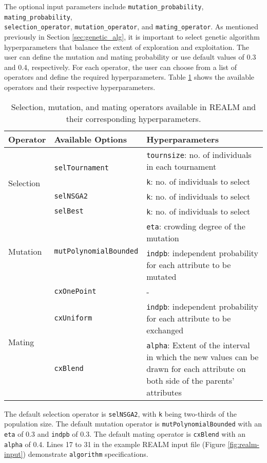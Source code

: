 The optional input parameters include \texttt{mutation\_probability}, 
\texttt{mating\_probability}, \\ \texttt{selection\_operator}, 
\texttt{mutation\_operator}, and \texttt{mating\_operator}. 
As mentioned previously in Section \ref{sec:genetic_alg}, it is important to 
select genetic algorithm hyperparameters that balance the extent of exploration 
and exploitation.
The user can define the mutation and mating probability or use default values 
of 0.3 and 0.4, respectively. 
For each operator, the user can choose from a list of operators and define the
required hyperparameters. 
Table \ref{tab:deap_operators} shows the available operators and their respective 
hyperparameters. 
\begin{table}[]
    \centering
    \onehalfspacing
    \caption{Selection, mutation, and mating operators available in 
    \acrfull{REALM} and their corresponding hyperparameters. }
	\label{tab:deap_operators}
    \footnotesize
    \begin{tabular}{l|p{}|p{}}
    \hline
    \textbf{Operator} & \textbf{Available Options} & \textbf{Hyperparameters} \\ \hline
    \multirow{4}{1cm}{Selection} & \multirow{2}{2cm}{\texttt{selTournament}} & \texttt{tournsize}: no. of individuals in each tournament\\ 
    & & \texttt{k}: no. of individuals to select \\ \cline{2-3}
    & \texttt{selNSGA2} & \texttt{k}: no. of individuals to select\\ \cline{2-3}
    & \texttt{selBest} & \texttt{k}: no. of individuals to select\\ \hline
    \multirow{2}{1cm}{Mutation} & \multirow{2}{2cm}{\texttt{mutPolynomialBounded}} & \texttt{eta}: crowding degree of the mutation\\  
    && \texttt{indpb}: independent probability for each attribute to be mutated\\ \hline
    \multirow{3}{1cm}{Mating} & \texttt{cxOnePoint} & -\\ \cline{2-3}
    & \texttt{cxUniform} & \texttt{indpb}: independent probability for each attribute to be exchanged\\ \cline{2-3}
    & \texttt{cxBlend} & \texttt{alpha}: Extent of the interval in which the new values can be drawn for each attribute on both side of the parents’ attributes\\ \hline
    \end{tabular}
    \end{table}
The default selection operator is \texttt{selNSGA2}, with
\texttt{k} being two-thirds of the population size. 
The default mutation operator is \texttt{mutPolynomialBounded} with an  
\texttt{eta} of 0.3 and \texttt{indpb} of 0.3. 
The default mating operator is \texttt{cxBlend} with an \texttt{alpha} of 0.4. 
Lines 17 to 31 in the example REALM input file (Figure \ref{fig:realm-input}) 
demonstrate \texttt{algorithm} specifications. 

